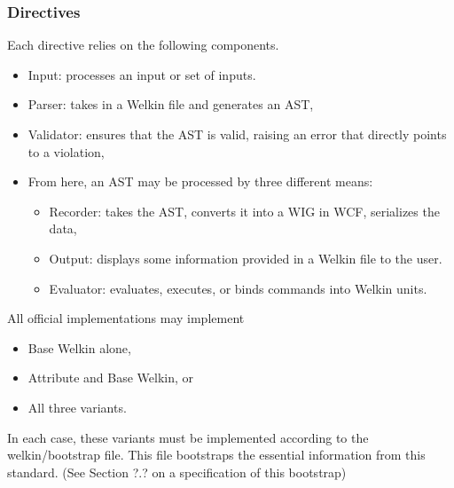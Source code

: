 \subsubsection*{Directives}
Each directive relies on the following components.
\begin{itemize}
  \item Input: processes an input or set of inputs.
  \item Parser: takes in a Welkin file and generates an AST,
  \item Validator: ensures that the AST is valid, raising an error that directly points to a violation,
  \item From here, an AST may be processed by three different means:
		\begin{itemize}
		  \item Recorder: takes the AST, converts it into a WIG in WCF, serializes the data,
		  \item Output: displays some information provided in a Welkin file to the user.
		  \item Evaluator: evaluates, executes, or binds commands into Welkin units.
		\end{itemize}
\end{itemize}

All official implementations may implement
\begin{itemize}
\item Base Welkin alone,
\item Attribute and Base Welkin, or
\item All three variants.
\end{itemize}

In each case, these variants must be implemented according to the welkin/bootstrap file. This file bootstraps the essential information from this standard. (See Section ?.? on a specification of this bootstrap)


